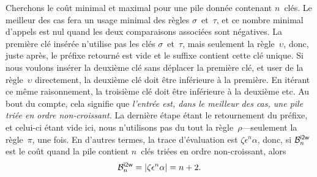 
Cherchons le coût minimal et maximal pour une pile donnée contenant
\(n\)~clés. Le meilleur des cas fera un usage minimal des règles
\(\sigma\)~et~\(\tau\), et ce nombre minimal d'appels est nul quand
les deux comparaisons associées sont négatives. La première clé
insérée n'utilise pas les clés \(\sigma\)~et~\(\tau\), mais seulement
la règle~\(\upsilon\), donc, juste après, le préfixe retourné est vide
et le suffixe contient cette clé unique. Si nous voulons insérer la
deuxième clé sans déplacer la première clé, et user de la
règle~\(\upsilon\) directement, la deuxième clé doit être inférieure à
la première. En itérant ce même raisonnement, la troisième clé doit
être inférieure à la deuxième etc. Au bout du compte, cela signifie
que \emph{l'entrée est, dans le meilleur des cas, une pile triée en
  ordre non-croissant.} La dernière étape étant le retournement du
préfixe, et celui-ci étant vide ici, nous n'utilisons pas du tout la
règle~\(\rho\)---seulement la règle~\(\pi\), une fois. En d'autres
termes, la trace d'évaluation est \(\zeta\epsilon^n\alpha\), donc, si
\(\B{\fun{i2w}}{n}\) est le coût quand la pile contient \(n\)~clés
triées en ordre non-croissant, alors
\begin{equation*}
\B{\fun{i2w}}{n} = \len{\zeta\epsilon^n\alpha} = n + 2.
\end{equation*}

